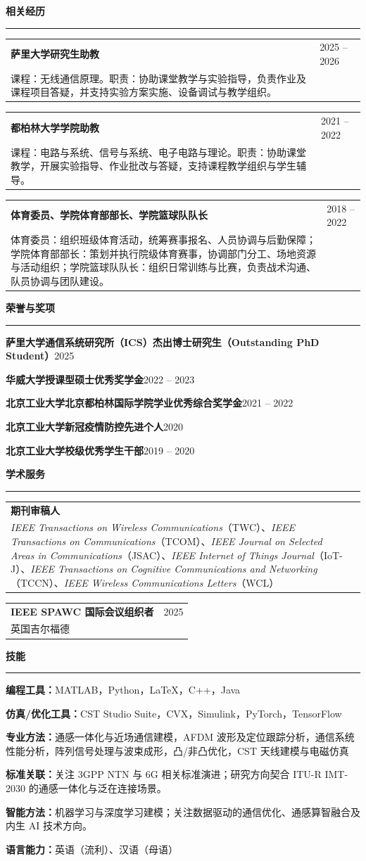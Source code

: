 \documentclass[10.5pt,a4paper,fontset=fandol]{ctexart}
\makeatletter
\newcommand{\ressection}[1]{%
  \needspace{3\baselineskip}\vspace{.55em}%
  {\zihao{4}\bfseries #1}\par\vspace{-.45em}%
  \noindent\rule{\textwidth}{0.45pt}\vspace{.30em}}
\newcommand{\dateditem}[3]{%
  \begin{tabularx}{\textwidth}{@{}>{\raggedright\arraybackslash}X>{\raggedleft\arraybackslash}p{2.1cm}@{}}
    \textbf{#1} & {\color{gray}#2}\\[-.1em]
    #3 &
  \end{tabularx}\vspace{.18em}}
\makeatother
\begin{document}
\ressection{相关经历}
\dateditem{萨里大学研究生助教}{2025 -- 2026}{课程：无线通信原理。职责：协助课堂教学与实验指导，负责作业及课程项目答疑，并支持实验方案实施、设备调试与教学组织。}
\dateditem{都柏林大学学院助教}{2021 -- 2022}{课程：电路与系统、信号与系统、电子电路与理论。职责：协助课堂教学，开展实验指导、作业批改与答疑，支持课程教学组织与学生辅导。}
\dateditem{体育委员、学院体育部部长、学院篮球队队长}{2018 -- 2022}{体育委员：组织班级体育活动，统筹赛事报名、人员协调与后勤保障；学院体育部部长：策划并执行院级体育赛事，协调部门分工、场地资源与活动组织；学院篮球队队长：组织日常训练与比赛，负责战术沟通、队员协调与团队建设。}

\ressection{荣誉与奖项}\par\nobreak
\noindent\textbf{萨里大学通信系统研究所（ICS）杰出博士研究生（Outstanding PhD Student）}\hfill{\color{gray}2025}\par
\noindent\textbf{华威大学授课型硕士优秀奖学金}\hfill{\color{gray}2022 -- 2023}\par
\noindent\textbf{北京工业大学北京都柏林国际学院学业优秀综合奖学金}\hfill{\color{gray}2021 -- 2022}\par
\noindent\textbf{北京工业大学新冠疫情防控先进个人}\hfill{\color{gray}2020}\par
\noindent\textbf{北京工业大学校级优秀学生干部}\hfill{\color{gray}2019 -- 2020}\par

\ressection{学术服务}
\dateditem{期刊审稿人}{}{\textit{IEEE Transactions on Wireless Communications}（TWC）、\textit{IEEE Transactions on Communications}（TCOM）、\textit{IEEE Journal on Selected Areas in Communications}（JSAC）、\textit{IEEE Internet of Things Journal}（IoT-J）、\textit{IEEE Transactions on Cognitive Communications and Networking}（TCCN）、\textit{IEEE Wireless Communications Letters}（WCL）}
\dateditem{IEEE SPAWC 国际会议组织者}{2025}{英国吉尔福德}

\ressection{技能}
\textbf{编程工具：}MATLAB，Python，LaTeX，C++，Java\par\vspace{.35em}
\textbf{仿真/优化工具：}CST Studio Suite，CVX，Simulink，PyTorch，TensorFlow\par\vspace{.35em}
\textbf{专业方法：}通感一体化与近场通信建模，AFDM 波形及定位跟踪分析，通信系统性能分析，阵列信号处理与波束成形，凸/非凸优化，CST 天线建模与电磁仿真\par\vspace{.35em}
\textbf{标准关联：}关注 3GPP NTN 与 6G 相关标准演进；研究方向契合 ITU-R IMT-2030 的通感一体化与泛在连接场景。\par\vspace{.35em}
\textbf{智能方法：}机器学习与深度学习建模；关注数据驱动的通信优化、通感算智融合及内生 AI 技术方向。\par\vspace{.35em}
\textbf{语言能力：}英语（流利）、汉语（母语）
\end{document}
